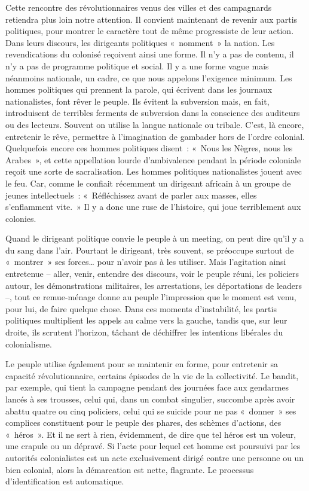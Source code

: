 \documentclass[french,twoside]{book} %
\begin{document}
\noindent Cette rencontre des révolutionnaires venus des villes et des campagnards retiendra plus loin notre attention. Il convient maintenant de revenir aux partis politiques, pour montrer le caractère tout de même progressiste de leur action. Dans leurs discours, les dirigeants politiques « nomment » la nation. Les revendications du colonisé reçoivent ainsi une forme. Il n’y a pas de contenu, il n’y a pas de programme politique et social. Il y a une forme vague mais néanmoins nationale, un cadre, ce que nous appelons l’exigence minimum. Les hommes politiques qui prennent la parole, qui écrivent dans les journaux nationalistes, font rêver le peuple. Ils évitent la subversion mais, en fait, introduisent de terribles ferments de subversion dans la conscience des auditeurs ou des lecteurs. Souvent on utilise la langue nationale ou tribale. C’est, là encore, entretenir le rêve, permettre à l’imagination de gambader hors de l’ordre colonial. Quelquefois encore ces hommes politiques disent : « Nous les Nègres, nous les Arabes », et cette appellation lourde d’ambivalence pendant la période coloniale reçoit une sorte de sacralisation. Les hommes politiques nationalistes jouent avec le feu. Car, comme   le confiait récemment un dirigeant africain à un groupe de jeunes intellectuels : « Réfléchissez avant de parler aux masses, elles s’enflamment vite. » Il y a donc une ruse de l’histoire, qui joue terriblement aux colonies.\par
\bigbreak
\noindent Quand le dirigeant politique convie le peuple à un meeting, on peut dire qu’il y a du sang dans l’air. Pourtant le dirigeant, très souvent, se préoccupe surtout de « montrer » ses forces… pour n’avoir pas à les utiliser. Mais l’agitation ainsi entretenue – aller, venir, entendre des discours, voir le peuple réuni, les policiers autour, les démonstrations militaires, les arrestations, les déportations de leaders –, tout ce remue-ménage donne au peuple l’impression que le moment est venu, pour lui, de faire quelque chose. Dans ces moments d’instabilité, les partis politiques multiplient les appels au calme vers la gauche, tandis que, sur leur droite, ils scrutent l’horizon, tâchant de déchiffrer les intentions libérales du colonialisme.\par
Le peuple utilise également pour se maintenir en forme, pour entretenir sa capacité révolutionnaire, certains épisodes de la vie de la collectivité. Le bandit, par exemple, qui tient la campagne pendant des journées face aux gendarmes lancés à ses trousses, celui qui, dans un combat singulier, succombe après avoir abattu quatre ou cinq policiers, celui qui se suicide pour ne pas « donner » ses complices constituent pour le peuple des phares, des schèmes d’actions, des « héros ». Et il ne sert à rien, évidemment, de dire que tel héros est un voleur, une crapule ou un dépravé. Si l’acte pour lequel cet homme est poursuivi par les autorités colonialistes est un acte exclusivement dirigé contre une personne ou un bien colonial, alors la démarcation est nette, flagrante. Le processus d’identification est automatique.\par
\end{document}
